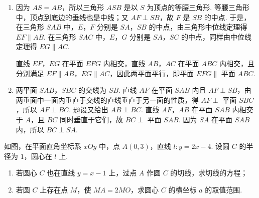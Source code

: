 \begin{solution}
\begin{enumerate}
\item 因为 \(AS=AB\)，所以三角形 \(ASB\) 是以 \(S\) 为顶点的等腰三角形. 等腰三角形中，顶点到底边的垂线也是中线；又 \(AF\perp SB\)，故 \(F\) 是 \(SB\) 的中点. 于是，在三角形 \(SAB\) 中，\(E\)，\(F\) 分别是 \(SA\)，\(SB\) 的中点，由三角形中位线定理得 \(EF\parallel AB\). 在三角形 \(SAC\) 中，\(E\)，\(G\) 分别是 \(SA\)，\(SC\) 的中点，同样由中位线定理得 \(EG\parallel AC\).

直线 \(EF\)，\(EG\) 在平面 \(EFG\) 内相交，直线 \(AB\)，\(AC\) 在平面 \(ABC\) 内相交，且分别满足 \(EF\parallel AB\)，\(EG\parallel AC\)，因此两平面平行，即平面 \(EFG\parallel\) 平面 \(ABC\).

\item 两平面 \(SAB\)，\(SBC\) 的交线为 \(SB\). 直线 \(AF\) 在平面 \(SAB\) 内且 \(AF\perp SB\)，由两垂面中一面内垂直于交线的直线垂直于另一面的性质，得 \(AF\perp\) 平面 \(SBC\)，所以 \(AF\perp BC\). 题设又给出 \(AB\perp BC\). 直线 \(AF\)，\(AB\) 在平面 \(SAB\) 内相交于 \(A\)，且 \(BC\) 同时垂直于它们，故 \(BC\perp\) 平面 \(SAB\). 因为 \(SA\) 在平面 \(SAB\) 内，所以 \(BC\perp SA\).
\end{enumerate}
\end{solution}

\begin{problem}
如图，在平面直角坐标系 \(xOy\) 中，点 \(A(0,3)\)，直线 \(l:y=2x-4\). 设圆 \(C\) 的半径为 \(1\)，圆心在 \(l\) 上.

\begin{enumerate}
\item 若圆心 \(C\) 也在直线 \(y=x-1\) 上，过点 \(A\) 作圆 \(C\) 的切线，求切线的方程；
\item 若圆 \(C\) 上存在点 \(M\)，使 \(MA=2MO\)，求圆心 \(C\) 的横坐标 \(a\) 的取值范围.
\end{enumerate}

\end{problem}

